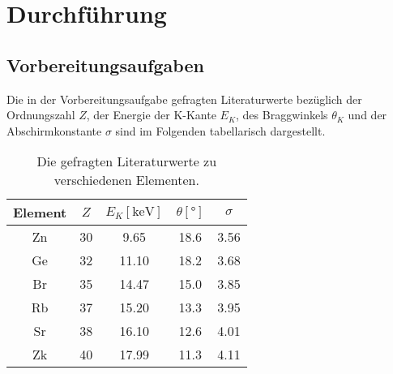\section{Durchführung}
\label{sec:Durchführung}
\subsection{Vorbereitungsaufgaben}
\label{sec:vorbereitung}
Die in der Vorbereitungsaufgabe gefragten Literaturwerte bezüglich der Ordnungszahl $Z$, der Energie der K-Kante $E_K$, des Braggwinkels
$\theta_K$ und der Abschirmkonstante $\sigma$ sind im Folgenden tabellarisch dargestellt.
\begin{table}[H]
    \centering
        \caption{Die gefragten Literaturwerte zu verschiedenen Elementen.\cite{AP05}}
        \label{tab:diss1}
        \begin{tabular}{S S[table-format=2.0] S[table-format=2.2] S[table-format=2.1] S}
          \toprule
          {Element} & {$Z$} & {$E_K [\si{\kilo\electronvolt}]$} & {$\theta [\si{\degree}]$} & {$\sigma$}\\
          \midrule
            {Zn} & 30 & 9.65  & 18.6 & 3.56 \\
            {Ge} & 32 & 11.10 & 18.2 & 3.68 \\
            {Br} & 35 & 14.47 & 15.0 & 3.85 \\
            {Rb} & 37 & 15.20 & 13.3 & 3.95 \\
            {Sr} & 38 & 16.10 & 12.6 & 4.01 \\
            {Zk} & 40 & 17.99 & 11.3 & 4.11 \\
          \bottomrule
        \end{tabular}
      \end{table}